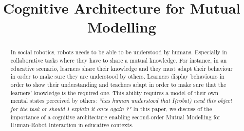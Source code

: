 \documentclass[conference]{IEEEtran}
\begin{document}
\title{Cognitive Architecture for Mutual Modelling}


\author{
}



\maketitle

\begin{abstract}
In social robotics, robots needs to be able to be understood by humans.
Especially in collaborative tasks where they have to share a mutual knowledge. 
For instance, in an educative scenario, learners share their knowledge and they must adapt their behaviour in order to make sure they are understood by others. 
Learners display behaviours in order to show their understanding and teachers adapt in order to make sure that the learners' knowledge is the required one. 
This ability requires a model of their own mental states perceived by others: \textit{``has human understood that I(robot) need this object for the task or should I explain it once again ?"}  
In this paper, we discuss of the importance of a cognitive architecture enabling second-order Mutual Modelling for Human-Robot Interaction in educative contexts.


\end{abstract}





%
\IEEEpeerreviewmaketitle
\end{document}
